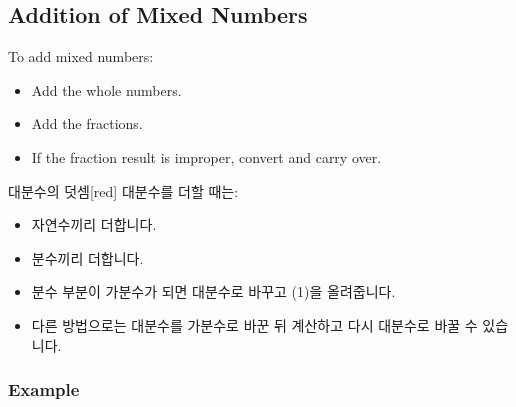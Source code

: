 \documentclass[12pt]{book}
\begin{document}
  
  
  
  \twosidedpaper
\subsection{Addition of Mixed Numbers}

To add mixed numbers:  
\begin{itemize}
  \item Add the whole numbers.  
  \item Add the fractions.  
  \item If the fraction result is improper, convert and carry over.  
\end{itemize}

\begin{flexbox}{대분수의 덧셈}[red]
대분수를 더할 때는:  
\begin{itemize}
  \item 자연수끼리 더합니다.  
  \item 분수끼리 더합니다.  
  \item 분수 부분이 가분수가 되면 대분수로 바꾸고 (1)을 올려줍니다.  
  \item 다른 방법으로는 대분수를 가분수로 바꾼 뒤 계산하고 다시 대분수로 바꿀 수 있습니다.  
\end{itemize}
\end{flexbox}

\subsubsection*{Example}
\end{document}
